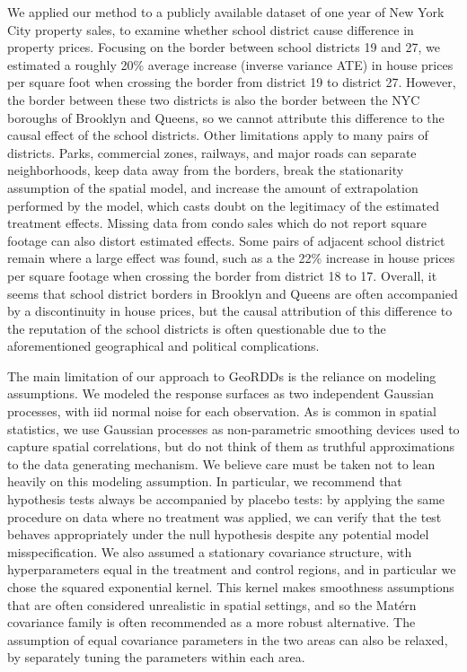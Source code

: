 \documentclass[letter]{article}
\begin{document}
    	We applied our method to a publicly available dataset of one year of New York City property sales, to examine whether school district cause difference in property prices.
Focusing on the border between school districts 19 and 27, we estimated a roughly 20\% average increase (inverse variance ATE) in house prices per square foot when crossing the border from district 19 to district 27.
However, the border between these two districts is also the border between the NYC boroughs of Brooklyn and Queens, so we cannot attribute this difference to the causal effect of the school districts.
Other limitations apply to many pairs of districts.
Parks, commercial zones, railways, and major roads can separate neighborhoods, keep data away from the borders, break the stationarity assumption of the spatial model, and increase the amount of extrapolation performed by the model, which casts doubt on the legitimacy of the estimated treatment effects.
Missing data from condo sales which do not report square footage can also distort estimated effects.
Some pairs of adjacent school district remain where a large effect was found, such as a the 22\% increase in house prices per square footage when crossing the border from district 18 to 17.
Overall, it seems that school district borders in Brooklyn and Queens are often accompanied by a discontinuity in house prices, but the causal attribution of this difference to the reputation of the school districts is often questionable due to the aforementioned geographical and political complications.
    


    	The main limitation of our approach to GeoRDDs is the reliance on modeling assumptions.
We modeled the response surfaces as two independent Gaussian processes, with iid normal noise for each observation.
As is common in spatial statistics, we use Gaussian processes as non-parametric smoothing devices used to capture spatial correlations, but do not think of them as truthful approximations to the data generating mechanism.
We believe care must be taken not to lean heavily on this modeling assumption.
In particular, we recommend that hypothesis tests always be accompanied by placebo tests:
by applying the same procedure on data where no treatment was applied, we can verify that the test behaves appropriately under the null hypothesis despite any potential model misspecification.
We also assumed a stationary covariance structure, with hyperparameters equal in the treatment and control regions, and in particular we chose the squared exponential kernel.
This kernel makes smoothness assumptions that are often considered unrealistic in spatial settings, and so the Matérn covariance family is often recommended as a more robust alternative.
The assumption of equal covariance parameters in the two areas can also be relaxed, by separately tuning the parameters within each area.
\end{document}
